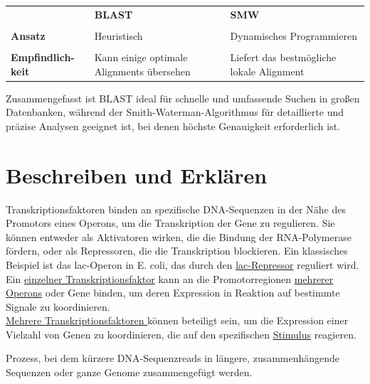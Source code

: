 \begin{table}[H]
    \centering
    \begin{tabular}{p{2cm}p{6cm}p{6cm}}
         &  \textbf{BLAST} & \textbf{SMW}\\ \\
       \textbf{Ansatz}  & Heuristisch & Dynamisches Programmieren \\ \\
       \textbf{Empfindlich-keit} & Kann einige optimale Alignments übersehen & Liefert das bestmögliche lokale Alignment 
    \end{tabular}
\end{table}
\noindent Zusammengefasst ist BLAST ideal für schnelle und umfassende Suchen in großen Datenbanken, während der Smith-Waterman-Algorithmus für detaillierte und präzise Analysen geeignet ist, bei denen höchste Genauigkeit erforderlich ist.

\section{Beschreiben und Erklären}

Transkriptionsfaktoren binden an spezifische DNA-Sequenzen in der Nähe des Promotors eines Operons, um die Transkription der Gene zu regulieren. Sie können entweder als Aktivatoren wirken, die die Bindung der RNA-Polymerase fördern, oder als Repressoren, die die Transkription blockieren. Ein klassisches Beispiel ist das lac-Operon in E. coli, das durch den \underline{lac-Repressor} reguliert wird. \\  \newline Ein \underline{einzelner Transkriptionsfaktor} kann an die Promotorregionen \underline{mehrerer Operons} oder Gene binden, um deren Expression in Reaktion auf bestimmte Signale zu koordinieren. \\ \newline \underline{Mehrere Transkriptionsfaktoren }können beteiligt sein, um die Expression einer Vielzahl von Genen zu koordinieren, die auf den spezifischen \underline{Stimulus} reagieren. \\ \newline

Prozess, bei dem kürzere DNA-Sequenzreads in längere, zusammenhängende Sequenzen oder ganze Genome zusammengefügt werden. \\ \newline

